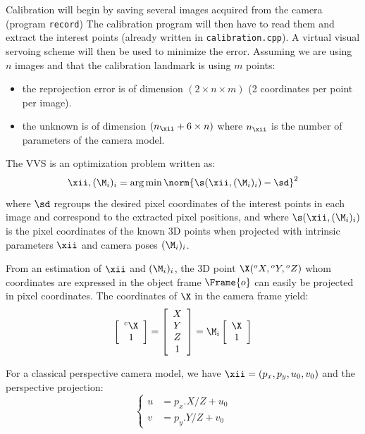 \documentclass{ecnreport}
\begin{document}
Calibration will begin by saving several images acquired from the camera (program \texttt{record}) The calibration program will then have to read them and extract the interest
points (already written in \texttt{calibration.cpp}). A virtual visual servoing scheme will then be used to minimize the error.
Assuming we are using $n$ images and that the calibration landmark is using $m$ points:
\begin{itemize}
 \item the reprojection error is of dimension $(2\times n\times m)$ (2 coordinates per point per image).
 \item the unknown is of dimension $(n_\xii + 6\times n)$ where $n_\xii$ is the number of parameters of the camera model.
\end{itemize}
The VVS is an optimization problem written as:
\begin{equation}\label{eq:calib}
 \xii, (\M_i)_i = \arg\min \norm{\s(\xii, (\M_i)_i) - \sd}^2
\end{equation}
where $\sd$ regroups the desired pixel coordinates of the interest points in each image and correspond to the extracted pixel positions, 
and where $\s(\xii, (\M_i)_i)$ is the pixel coordinates of the known 3D points when projected with intrinsic parameters $\xii$ and camera poses $(\M_i)_i$.

From an estimation of $\xii$ and $(\M_i)_i$, the 3D point $\X({}^o X,{}^o Y,{}^o Z)$ whom coordinates are expressed in the object frame $\Frame{o}$ can easily be projected in pixel coordinates.
The coordinates of $\X$ in the camera frame yield:
\begin{equation}\label{eq:framechange}
 \left[\begin{array}{c}{}^c\X\\1\end{array}\right]=   \left[\begin{array}{c}X\\Y\\Z\\1\end{array}\right] =\M_i\left[\begin{array}{c}\X\\1\end{array}\right]
\end{equation}

For a classical perspective camera model, we have $\xii = (p_x, p_y, u_0, v_0)$ and the perspective projection:
\begin{equation}\label{eq:projection}
 \left\{\begin{array}{ll}
  u &= p_x.X/Z + u_0 \\
  v &= p_y.Y/Z + v_0
 \end{array}\right.
\end{equation}
\end{document}
